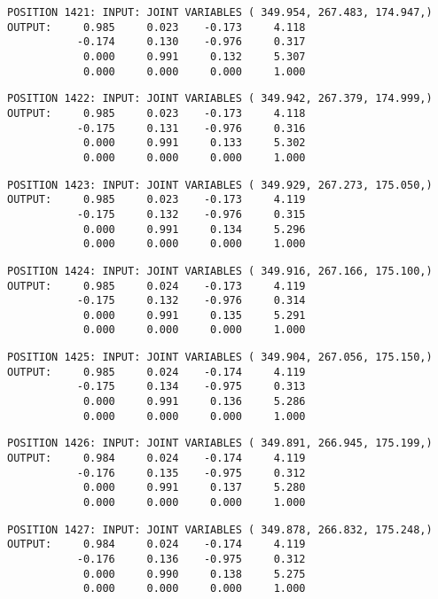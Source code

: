 \begin{verbatim}
POSITION 1421: INPUT: JOINT VARIABLES ( 349.954, 267.483, 174.947,)
OUTPUT:     0.985     0.023    -0.173     4.118
           -0.174     0.130    -0.976     0.317
            0.000     0.991     0.132     5.307
            0.000     0.000     0.000     1.000
\end{verbatim} \pagebreak[1]\begin{verbatim}
POSITION 1422: INPUT: JOINT VARIABLES ( 349.942, 267.379, 174.999,)
OUTPUT:     0.985     0.023    -0.173     4.118
           -0.175     0.131    -0.976     0.316
            0.000     0.991     0.133     5.302
            0.000     0.000     0.000     1.000
\end{verbatim} \pagebreak[1]\begin{verbatim}
POSITION 1423: INPUT: JOINT VARIABLES ( 349.929, 267.273, 175.050,)
OUTPUT:     0.985     0.023    -0.173     4.119
           -0.175     0.132    -0.976     0.315
            0.000     0.991     0.134     5.296
            0.000     0.000     0.000     1.000
\end{verbatim} \pagebreak[1]\begin{verbatim}
POSITION 1424: INPUT: JOINT VARIABLES ( 349.916, 267.166, 175.100,)
OUTPUT:     0.985     0.024    -0.173     4.119
           -0.175     0.132    -0.976     0.314
            0.000     0.991     0.135     5.291
            0.000     0.000     0.000     1.000
\end{verbatim} \pagebreak[1]\begin{verbatim}
POSITION 1425: INPUT: JOINT VARIABLES ( 349.904, 267.056, 175.150,)
OUTPUT:     0.985     0.024    -0.174     4.119
           -0.175     0.134    -0.975     0.313
            0.000     0.991     0.136     5.286
            0.000     0.000     0.000     1.000
\end{verbatim} \pagebreak[1]\begin{verbatim}
POSITION 1426: INPUT: JOINT VARIABLES ( 349.891, 266.945, 175.199,)
OUTPUT:     0.984     0.024    -0.174     4.119
           -0.176     0.135    -0.975     0.312
            0.000     0.991     0.137     5.280
            0.000     0.000     0.000     1.000
\end{verbatim} \pagebreak[1]\begin{verbatim}
POSITION 1427: INPUT: JOINT VARIABLES ( 349.878, 266.832, 175.248,)
OUTPUT:     0.984     0.024    -0.174     4.119
           -0.176     0.136    -0.975     0.312
            0.000     0.990     0.138     5.275
            0.000     0.000     0.000     1.000
\end{verbatim} \pagebreak[1]\begin{verbatim}

\end{verbatim}
